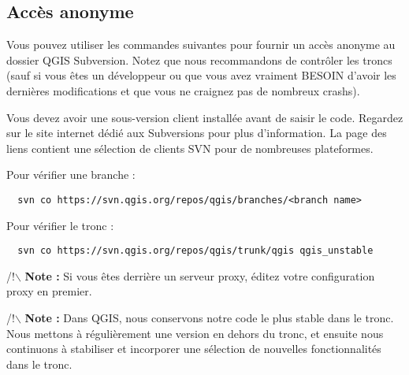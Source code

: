 \subsection{Acc\`es anonyme}

Vous pouvez utiliser les commandes suivantes pour fournir un acc\`es anonyme au dossier QGIS Subversion. Notez que nous recommandons de contr\^oler les troncs (sauf si vous \^etes un d\'eveloppeur ou que vous avez vraiment BESOIN d'avoir les derni\`eres modifications et que vous ne craignez pas de nombreux crashs).

Vous devez avoir une sous-version client install\'ee avant de saisir le code. Regardez sur le site internet d\'edi\'e aux Subversions pour plus d'information. La page des liens contient une s\'election de clients SVN pour de nombreuses plateformes.

Pour v\'erifier une branche :

\begin{verbatim}
  svn co https://svn.qgis.org/repos/qgis/branches/<branch name>
\end{verbatim}

Pour v\'erifier le tronc :

\begin{verbatim}
  svn co https://svn.qgis.org/repos/qgis/trunk/qgis qgis_unstable
\end{verbatim}

/!$\backslash$ \textbf{Note :} Si vous \^etes derri\`ere un serveur proxy, \'editez votre configuration proxy en premier.

/!$\backslash$ \textbf{Note :} Dans QGIS, nous conservons notre code le plus stable dans le tronc. Nous mettons \`a r\'eguli\`erement une version en dehors du tronc, et ensuite nous continuons \`a stabiliser et incorporer une s\'election de nouvelles fonctionnalit\'es  dans le tronc.


